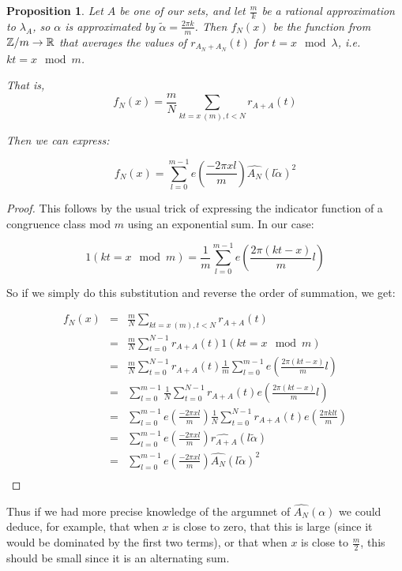 \documentclass{article}
\newtheorem{proposition}[theorem]{Proposition}
\theoremstyle{definition}
\theoremstyle{remark}
\numberwithin{equation}{section}
\begin{document}
\begin{proposition}
  Let $A$ be one of our \relevant sets, and let $\frac{m}{k}$ be a
  rational approximation to $\lambda_A$, so $\alpha$ is approximated
  by $\widetilde{\alpha} = \frac{2\pi k}{m}$.  Then $f_N(x)$ be the
  function from $\mathbb{Z}/m \to \mathbb{R}$ that averages the values of
  $r_{A_N+A_N}(t)$ for $t = x \mod{\lambda}$, i.e. $kt = x \mod{m}$.

  That is, 
  \[f_N(x) = \frac{m}{N} \sum_{kt = x\ \!(m), t < N} r_{A+A}(t)\]

  Then we can express: 

  \[f_N(x) = \sum_{l=0}^{m-1} e(\frac{-2\pi x l}{m}) \widehat{A_N}(l\widetilde{\alpha})^2\]
\end{proposition}

\begin{proof}

This follows by the usual trick of expressing the indicator function
of a congruence class mod $m$ using an exponential sum.  In our case: 


\[1(kt = x\!\!\!\!\mod{m}) = \frac{1}{m}\sum_{l=0}^{m-1} e(\frac{2\pi
    (kt-x)}{m}l)\]

So if we simply do this substitution and reverse the order of
summation, we get: 

\begin{eqnarray*}
  f_N(x) &=& \frac{m}{N} \sum_{kt = x\ \!(m), t < N} r_{A+A}(t)\\
         &=& \frac{m}{N} \sum_{t = 0}^{N-1} r_{A+A}(t)1(kt = x\!\!\!\!\mod{m})\\
         &=& \frac{m}{N} \sum_{t = 0}^{N-1}
             r_{A+A}(t)\frac{1}{m}\sum_{l=0}^{m-1} e(\frac{2\pi (kt-x)}{m}l)\\
         &=& \sum_{l=0}^{m-1} \frac{1}{N} \sum_{t = 0}^{N-1}
             r_{A+A}(t) e(\frac{2\pi (kt-x)}{m}l)\\
         &=& \sum_{l=0}^{m-1} e(\frac{-2\pi x l}{m}) \frac{1}{N} \sum_{t = 0}^{N-1}
             r_{A+A}(t) e(\frac{2\pi klt}{m})\\
         &=& \sum_{l=0}^{m-1} e(\frac{-2\pi x l}{m}) \widehat{r_{A+A}}(l\widetilde{\alpha})\\
         &=& \sum_{l=0}^{m-1} e(\frac{-2\pi x l}{m}) \widehat{A_N}(l\widetilde{\alpha})^2\\
\end{eqnarray*}

\end{proof}

Thus if we had more precise knowledge of the argumnet of
$\widehat{A_N}(\alpha)$ we could deduce, for example, that when $x$ is
close to zero, that this is large (since it would be dominated by the
first two terms), or that when $x$ is close to $\frac{m}{2}$, this
should be small since it is an alternating sum.
\end{document}
